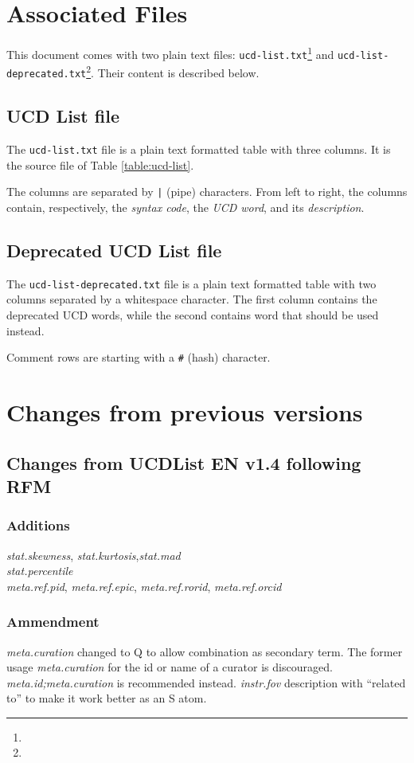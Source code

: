 \documentclass[11pt,a4paper]{ivoa}
\begin{document}
\section{Associated Files}
This document comes with two plain text files:
\texttt{ucd-list.txt}\footnote{} and 
\texttt{ucd-list-deprecated.txt}\footnote{}. 
Their content is described below. 

\subsection{UCD List file}
The \texttt{ucd-list.txt} file is a plain text formatted table with
three columns.
It is the source file of Table \ref{table:ucd-list}.

The columns are separated by \texttt{|} (pipe) characters. From left to right, the 
columns contain, respectively, the \emph{syntax code}, the \emph{UCD word}, and its
\emph{description}. 

\subsection{Deprecated UCD List file}
The \texttt{ucd-list-deprecated.txt} file is a plain text formatted table with two
columns separated by a whitespace character. The first column contains the deprecated 
UCD words, while the second contains word that should be used instead.

Comment rows are starting with a \texttt{\#} (hash) character.

\section{Changes from previous versions}
\subsection{Changes from UCDList EN v1.4 following RFM}
\subsubsection*{Additions}
\emph{stat.skewness}, \emph{stat.kurtosis},\emph{stat.mad} \\
\emph{stat.percentile} \\
\emph{meta.ref.pid}, \emph{meta.ref.epic}, \emph{meta.ref.rorid}, \emph{meta.ref.orcid} \\

\subsubsection*{Ammendment}
\emph{meta.curation} changed to Q to allow combination as secondary term. The former usage \emph{meta.curation} for the id or name of a curator is discouraged. \emph{meta.id;meta.curation} is recommended instead.
\emph{instr.fov} description with ``related to'' to make it work better as an S atom.
\end{document}
